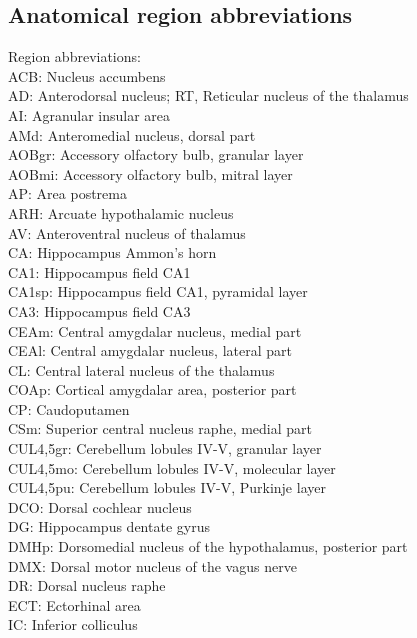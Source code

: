\subsection{Anatomical region abbreviations}
Region abbreviations:\\
ACB: Nucleus accumbens\\
AD: Anterodorsal nucleus; RT, Reticular nucleus of the thalamus\\
AI: Agranular insular area\\
AMd: Anteromedial nucleus, dorsal part\\ 
AOBgr: Accessory olfactory bulb, granular layer\\ 
AOBmi: Accessory olfactory bulb, mitral layer\\
AP: Area postrema \\
ARH: Arcuate hypothalamic nucleus\\ 
AV: Anteroventral nucleus of thalamus\\ 
CA: Hippocampus Ammon’s horn \\
CA1: Hippocampus field CA1 \\
CA1sp: Hippocampus field CA1, pyramidal layer\\ 
CA3: Hippocampus field CA3 \\
CEAm: Central amygdalar nucleus, medial part\\ 
CEAl: Central amygdalar nucleus, lateral part \\
CL: Central lateral nucleus of the thalamus \\
COAp: Cortical amygdalar area, posterior part \\
CP: Caudoputamen \\
CSm: Superior central nucleus raphe, medial part\\ 
CUL4,5gr: Cerebellum lobules IV-V, granular layer \\
CUL4,5mo: Cerebellum lobules IV-V, molecular layer \\
CUL4,5pu: Cerebellum lobules IV-V, Purkinje layer \\
DCO: Dorsal cochlear nucleus \\
DG: Hippocampus dentate gyrus \\
DMHp: Dorsomedial nucleus of the hypothalamus, posterior part \\
DMX: Dorsal motor nucleus of the vagus nerve \\
DR: Dorsal nucleus raphe \\
ECT: Ectorhinal area \\
IC: Inferior colliculus\\ 
